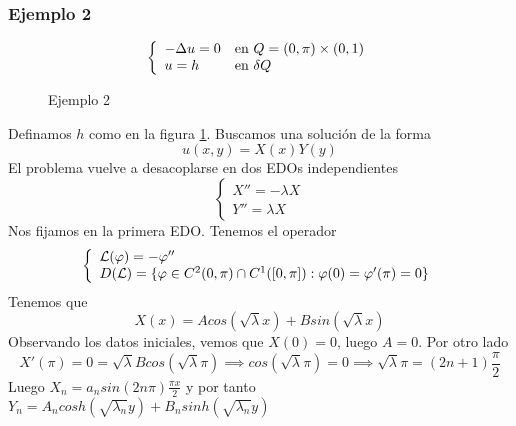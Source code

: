 \subsubsection*{Ejemplo 2}
\begin{equation*}
\left\{
\begin{array}{l l}
-\Delta u = 0 & \text{en } Q=(0,\pi)\times(0,1)\\
u=h & \text{en } \delta Q
\end{array}
\right.
\end{equation*}
\begin{figure}[ht]
\centering
{}
\caption{Ejemplo 2}
\label{fig:ej2-sepvar}
\end{figure}
Definamos $h$ como en la figura \ref{fig:ej2-sepvar}.
Buscamos una solución de la forma
$$u(x,y) = X(x)Y(y)$$
El problema vuelve a desacoplarse en dos EDOs independientes
\begin{equation*}
\left\{
\begin{array}{l}
X''=-\lambda X\\
Y'' = \lambda X
\end{array}
\right.
\end{equation*}
Nos fijamos en la primera EDO. Tenemos el operador
\begin{equation*}
\left\{
\begin{array}{l l}
\mathcal{L}(\varphi) = -\varphi''\\
D(\mathcal{L}) = \{\varphi\in C^2(0,\pi)\cap C^1([0,\pi]): \varphi(0) = \varphi'(\pi) = 0\}
\end{array}
\right.
\end{equation*}
Tenemos que 
$$X(x) = Acos(\sqrt{\lambda}x)+Bsin(\sqrt{\lambda}x)$$
Observando los datos iniciales, vemos que $X(0)=0$, luego $A=0$. Por otro lado
$$X'(\pi) = 0 = \sqrt{\lambda}Bcos(\sqrt{\lambda}\pi) \implies cos(\sqrt{\lambda}\pi) = 0 \implies \sqrt{\lambda}\pi = (2n+1)\frac{\pi}{2}$$
Luego $X_n=a_nsin(2n\pi)\frac{\pi x}{2}$
y por tanto $Y_n = A_ncosh(\sqrt{\lambda_n}y)+B_nsinh(\sqrt{\lambda_n}y)$

